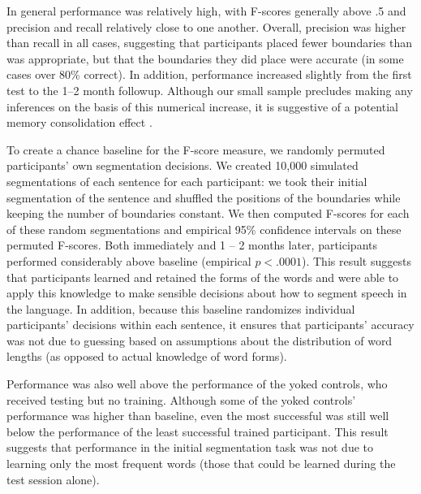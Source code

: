 \documentclass[10pt]{article}
\begin{document}
In general performance was relatively high, with F-scores generally above .5 and precision and recall relatively close to one another. Overall, precision was higher than recall in all cases, suggesting that participants placed fewer boundaries than was appropriate, but that the boundaries they did place were accurate (in some cases over 80\% correct). In addition, performance increased slightly from the first test to the 1--2 month followup. Although our small sample precludes making any inferences on the basis of this numerical increase, it is suggestive of a potential memory consolidation effect \cite{mcgaugh2000}. 

To create a chance baseline for the F-score measure, we randomly permuted participants' own segmentation decisions. We created 10,000 simulated segmentations of each sentence for each participant: we took their initial segmentation of the sentence and shuffled the positions of the boundaries while keeping the number of boundaries constant. We then computed F-scores for each of these random segmentations and empirical 95\% confidence intervals on these permuted F-scores. Both immediately and 1 -- 2 months later, participants performed considerably above baseline (empirical $p < .0001$). This result suggests that participants learned and retained the forms of the words and were able to apply this knowledge to make sensible decisions about how to segment speech in the language. In addition, because this baseline randomizes individual participants' decisions within each sentence, it ensures that participants' accuracy was not due to guessing based on assumptions about the distribution of word lengths (as opposed to actual knowledge of word forms). 

Performance was also well above the performance of the yoked controls, who received testing but no training. Although some of the yoked controls' performance was higher than baseline, even the most successful was still well below the performance of the least successful trained participant. This result suggests that performance in the initial segmentation task was not due to learning only the most frequent words (those that could be learned during the test session alone). 
\end{document}
